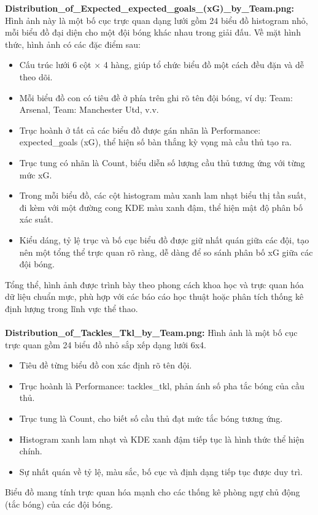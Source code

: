 \documentclass[12pt]{report}
\begin{document}
{\textbf{Distribution\_of\_Expected\_expected\_goals\_(xG)\_by\_Team.png:}
Hình ảnh này là một bố cục trực quan dạng lưới gồm 24 biểu đồ histogram nhỏ, mỗi biểu đồ đại diện cho một đội bóng khác nhau trong giải đấu. Về mặt hình thức, hình ảnh có các đặc điểm sau:
\begin{itemize}
	\item Cấu trúc lưới 6 cột × 4 hàng, giúp tổ chức biểu đồ một cách đều đặn và dễ theo dõi.
	\item Mỗi biểu đồ con có tiêu đề ở phía trên ghi rõ tên đội bóng, ví dụ: Team: Arsenal, Team: Manchester Utd, v.v.
	\item Trục hoành ở tất cả các biểu đồ được gán nhãn là Performance: expected\_goals (xG), thể hiện số bàn thắng kỳ vọng mà cầu thủ tạo ra.
	\item Trục tung có nhãn là Count, biểu diễn số lượng cầu thủ tương ứng với từng mức xG.
	\item Trong mỗi biểu đồ, các cột histogram màu xanh lam nhạt biểu thị tần suất, đi kèm với một đường cong KDE màu xanh đậm, thể hiện mật độ phân bố xác suất.
	\item Kiểu dáng, tỷ lệ trục và bố cục biểu đồ được giữ nhất quán giữa các đội, tạo nên một tổng thể trực quan rõ ràng, dễ dàng để so sánh phân bố xG giữa các đội bóng.
\end{itemize}
Tổng thể, hình ảnh được trình bày theo phong cách khoa học và trực quan hóa dữ liệu chuẩn mực, phù hợp với các báo cáo học thuật hoặc phân tích thống kê định lượng trong lĩnh vực thể thao.
\\\\
\textbf{Distribution\_of\_Tackles\_Tkl\_by\_Team.png:}
Hình ảnh là một bố cục trực quan gồm 24 biểu đồ nhỏ sắp xếp dạng lưới 6x4.
\begin{itemize}
	\item Tiêu đề từng biểu đồ con xác định rõ tên đội.
	\item Trục hoành là Performance: tackles\_tkl, phản ánh số pha tắc bóng của cầu thủ.
	\item Trục tung là Count, cho biết số cầu thủ đạt mức tắc bóng tương ứng.
	\item Histogram xanh lam nhạt và KDE xanh đậm tiếp tục là hình thức thể hiện chính.
	\item Sự nhất quán về tỷ lệ, màu sắc, bố cục và định dạng tiếp tục được duy trì.
\end{itemize}
Biểu đồ mang tính trực quan hóa mạnh cho các thống kê phòng ngự chủ động (tắc bóng) của các đội bóng.
\\\\
}
\end{document}
